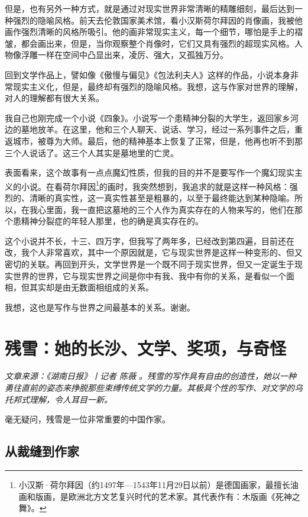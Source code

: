\documentclass[fontset=fandol,12pt,a5paper]{ctexbook}
\begin{document}
但是，也有另外一种方式，就是通过对现实世界非常清晰的精雕细刻，最后达到一种强烈的隐喻风格。前天去伦敦国家美术馆，看小汉斯荷尔拜因的肖像画，我被他画作强烈清晰的风格所吸引。他的画非常现实主义，每一个细节，哪怕是手上的褶皱，都会画出来，但是，当你观察整个肖像时，它们又具有强烈的超现实风格。人物像浮雕一样在空间中凸显出来，凌厉、强大，又孤独万分。

回到文学作品上，譬如像《傲慢与偏见》《包法利夫人》这样的作品，小说本身非常现实主义化，但是，最终却有强烈的隐喻风格。我想，这与作家对世界的理解，对人的理解都有很大关系。

我自己也刚完成一个小说《四象》。小说写一个患精神分裂的大学生，返回家乡河边的墓地放羊。在这里，他和三个人聊天、说话、学习，经过一系列事件之后，重返城市，被尊为大师。最后，他的精神基本上恢复了正常，但是，他再也听不到那三个人说话了。这三个人其实是墓地里的亡灵。

表面看来，这个故事有一点点魔幻性质，但我的目的并不是要写作一个魔幻现实主义的小说。在看荷尔拜因\footnote{小汉斯·荷尔拜因（约1497年—1543年11月29日以前）是德国画家，最擅长油画和版画，是欧洲北方文艺复兴时代的艺术家。其代表作有：木版画《死神之舞》。}的画时，我突然想到，我追求的就是这样一种风格：强烈的、清晰的真实性，这一真实性甚至是粗暴的，以至于最终能达到某种隐喻。所以，在我心里面，我一直把这墓地的三个人作为真实存在的人物来写的，他们在那个患精神分裂症的年轻人那里，也的确是真实存在的。

这个小说并不长，十三、四万字，但我写了两年多，已经改到第四遍，目前还在改，我个人非常喜欢，其中一个原因就是，它与现实世界是这样一种变形的、但又密切的关联。再回到开头，文学世界是一个既不同于现实世界，但又一定诞生于现实世界的世界，它与现实世界之间是你中有我、我中有你的关系，是看似一个面相，但其实却是由无数面相组成的关系。

我想，这也是写作与世界之间最基本的关系。谢谢。
\newpage

\section{残雪：她的长沙、文学、奖项，与奇怪}
\emph{文章来源：《湖南日报》丨记者 陈薇 。残雪的写作具有自由的创造性，她以一种勇往直前的姿态来挣脱那些束缚传统文学的力量。其极具个性的写作、对文学的乌托邦式理解，令人耳目一新。}
\vspace{2em}

毫无疑问，残雪是一位非常重要的中国作家。

\subsection{从裁缝到作家}
\end{document}

